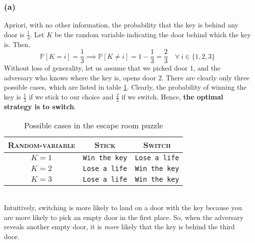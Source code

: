 \documentclass[12pt]{article}
\newcommand{\prob}[1]{\mathbb{P}\left[#1\right]}
\begin{document}
    \subsubsection*{(a)}
    Apriori, with no other information, the probability that the key is behind any
    door is $\frac{1}{3}$. Let $K$ be the random variable indicating the door behind
    which the key is. Then,
    \begin{equation}
        \prob{K = i} = \frac{1}{3} \implies \prob{K \neq i} = 1 - \frac{1}{3} = \frac{2}{3} \quad \forall \ i \in \{ 1, 2, 3 \}
    \end{equation}
    Without loss of generality, let us assume that we picked door 1, and the adversary
    who knows where the key is, opens door 2. There are clearly only three possible cases,
    which are listed in table \ref{tab:cases}. Clearly, the probability of winning the key
    is $\frac{1}{3}$ if we stick to our choice and $\frac{2}{3}$ if we switch. Hence,
    \textbf{the optimal strategy is to switch}.
    \begin{table}[htbp]
        \centering
        \renewcommand{\arraystretch}{1.5}
        \begin{tabular}{c|cc}
            \textsc{Random-variable} & \textsc{Stick} & \textsc{Switch} \\
            \hline
            $K = 1$ & \texttt{Win the key} & \texttt{Lose a life} \\
            $K = 2$ & \texttt{Lose a life} & \texttt{Win the key} \\
            $K = 3$ & \texttt{Lose a life} & \texttt{Win the key} \\
        \end{tabular}
        \caption{Possible cases in the escape room puzzle}
        \label{tab:cases}
    \end{table}
    \vspace*{0pt} \\
    Intuitively, switching is more likely to land on a door with the key because
    you are more likely to pick an empty door in the first place. So, when the
    adversary reveals another empty door, it is \textit{more} likely that the
    key is behind the third door.
\end{document}
